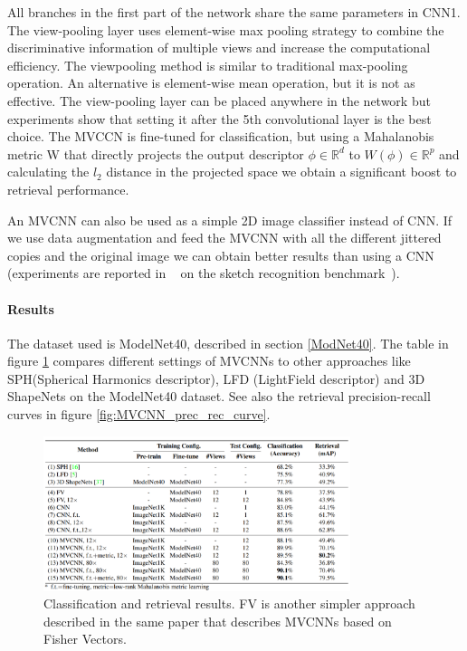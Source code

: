 All branches in the first part of the network share the same parameters in CNN1. The view-pooling layer uses element-wise max pooling strategy to combine the discriminative information of multiple views and increase the computational efficiency. The viewpooling method is similar to traditional max-pooling operation. An alternative is element-wise mean
operation, but it is not as effective. The view-pooling layer can be placed anywhere in the network but experiments show that setting it after the 5th convolutional layer is the best choice. The MVCCN is fine-tuned for classification, but using a Mahalanobis metric W that directly projects the output descriptor $\phi \in \mathbb{R}^d$ to $W(\phi) \in \mathbb{R}^p$ and calculating the $l_2$ distance in the projected space we obtain a significant boost to retrieval performance.

An MVCNN can also be used as a simple 2D image classifier instead of CNN. If we use data augmentation and feed the MVCNN with all the different jittered copies and the original image we can obtain better results than using a CNN (experiments are reported in ~\cite{multi_view} on the sketch recognition benchmark~\cite{eitz2012hdhso}).

\paragraph{Results}
The dataset used is ModelNet40, described in section \ref{ModNet40}. The table in figure \ref{fig:MVCNN_results_table} compares different settings of MVCNNs to other approaches like SPH(Spherical Harmonics descriptor), LFD (LightField descriptor) and 3D ShapeNets on the ModelNet40 dataset. See also the retrieval precision-recall curves in figure \ref{fig:MVCNN_prec_rec_curve}.

\begin{figure}[ht]
    \centering
    \captionsetup{width=.8\linewidth}
    \includegraphics[width=0.8\textwidth]{images/MVCNN_results_table.png}
    \caption{ Classification and retrieval results. FV is another simpler approach described in the same paper that describes MVCNNs based on Fisher Vectors.}
    \label{fig:MVCNN_results_table}
\end{figure}

